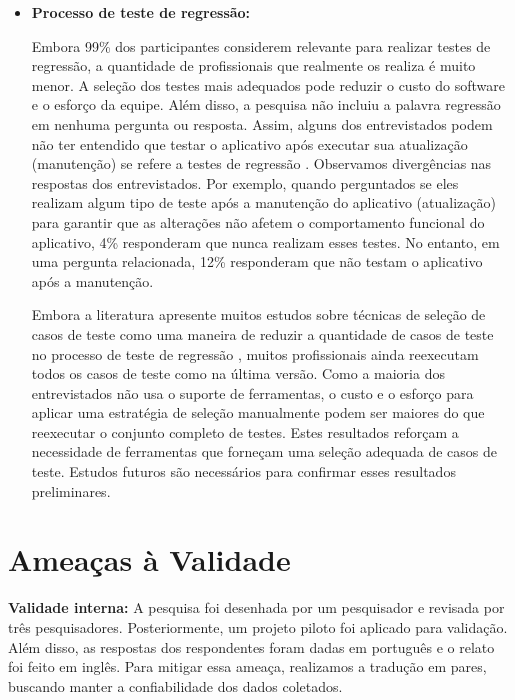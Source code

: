 \begin{itemize}
\item \textbf{Processo de teste de regressão:} 

Embora 99\% dos participantes considerem relevante para realizar testes de regressão, a quantidade de profissionais que realmente os realiza é muito menor. A seleção dos testes mais adequados pode reduzir o custo do software e o esforço da equipe. Além disso, a pesquisa não incluiu a palavra regressão em nenhuma pergunta ou resposta. Assim, alguns dos entrevistados podem não ter entendido que testar o aplicativo após executar sua atualização (manutenção) se refere a testes de regressão \cite{LEUNG1989}. Observamos divergências nas respostas dos entrevistados. Por exemplo, quando perguntados se eles realizam algum tipo de teste após a manutenção do aplicativo (atualização) para garantir que as alterações não afetem o comportamento funcional do aplicativo, 4\% responderam que nunca realizam esses testes. No entanto, em uma pergunta relacionada, 12\% responderam que não testam o aplicativo após a manutenção.
 
Embora a literatura apresente muitos estudos sobre técnicas de seleção de casos de teste como uma maneira de reduzir a quantidade de casos de teste no processo de teste de regressão \cite{LEUNG1989, WHITE1991, 536955, ENGSTROM201014, KAZMI2017}, muitos profissionais ainda reexecutam todos os casos de teste como na última versão. Como a maioria dos entrevistados não usa o suporte de ferramentas, o custo e o esforço para aplicar uma estratégia de seleção manualmente podem ser maiores do que reexecutar o conjunto completo de testes. Estes resultados reforçam a necessidade de ferramentas que forneçam uma seleção adequada de casos de teste. Estudos futuros são necessários para confirmar esses resultados preliminares.

\end{itemize}


\section{Ameaças à Validade}\label{threatstovalidity}

\textbf{Validade interna:} A pesquisa foi desenhada por um pesquisador e revisada por três pesquisadores. Posteriormente, um projeto piloto foi aplicado para validação. Além disso, as respostas dos respondentes foram dadas em português e o relato foi feito em inglês. Para mitigar essa ameaça, realizamos a tradução em pares, buscando manter a confiabilidade dos dados coletados.

